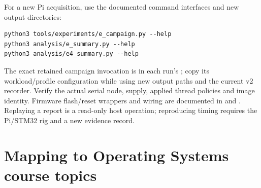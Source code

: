 \documentclass[a4paper,11pt]{article}
\newcommand{\page}{\clearpage}
\begin{document}
For a new Pi acquisition, use the documented command interfaces and new output directories:
\begin{verbatim}
python3 tools/experiments/e_campaign.py --help
python3 analysis/e_summary.py --help
python3 analysis/e4_summary.py --help
\end{verbatim}
The exact retained campaign invocation is in each run's ; copy its workload/profile configuration while using new output paths and the current v2 recorder. Verify the actual serial node, supply, applied thread policies and image identity. Firmware flash/reset wrappers and wiring are documented in  and . Replaying a report is a read-only host operation; reproducing timing requires the Pi/STM32 rig and a new evidence record.
\page
\section{Mapping to Operating Systems course topics}
\small
\end{document}
